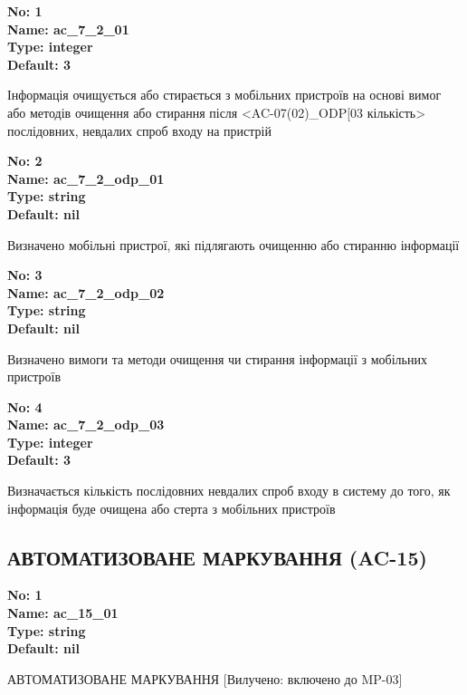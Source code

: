 \documentclass{article}
\begin{document}
\vspace{10pt}
{\footnotesize\bfseries
No: 1\\
Name: ac\_7\_2\_01\\
Type: integer\\
Default: 3
}

{\footnotesize Інформація очищується або стирається з мобільних пристроїв на основі вимог або методів очищення або стирання після <AC-07(02)\_ODP[03 кількість> послідовних, невдалих спроб входу на пристрій}


{\footnotesize\bfseries
No: 2\\
Name: ac\_7\_2\_odp\_01\\
Type: string\\
Default: nil
}

{\footnotesize Визначено мобільні пристрої, які підлягають очищенню або стиранню інформації}


{\footnotesize\bfseries
No: 3\\
Name: ac\_7\_2\_odp\_02\\
Type: string\\
Default: nil
}

{\footnotesize Визначено вимоги та методи очищення чи стирання інформації з мобільних пристроїв}


{\footnotesize\bfseries
No: 4\\
Name: ac\_7\_2\_odp\_03\\
Type: integer\\
Default: 3
}

{\footnotesize Визначається кількість послідовних невдалих спроб входу в систему до того, як інформація буде очищена або стерта з мобільних пристроїв}




\subsection{АВТОМАТИЗОВАНЕ МАРКУВАННЯ (AC-15)}


\vspace{10pt}
{\footnotesize\bfseries
No: 1\\
Name: ac\_15\_01\\
Type: string\\
Default: nil
}

{\footnotesize АВТОМАТИЗОВАНЕ МАРКУВАННЯ [Вилучено: включено до MP-03]}
\end{document}
